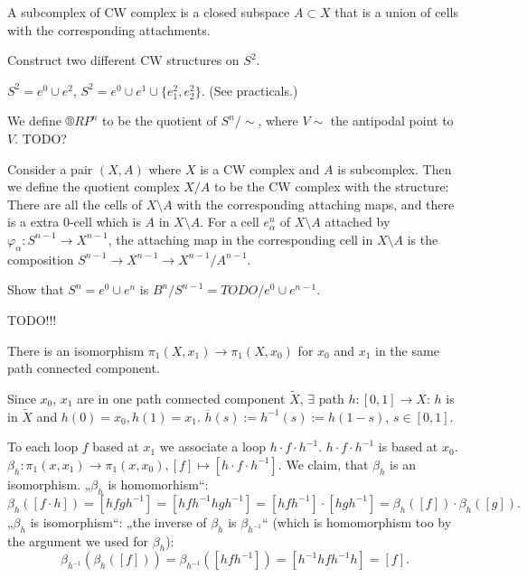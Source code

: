 \documentclass[12pt]{article}					%
\begin{document}
\begin{definice}
	A subcomplex of CW complex is a closed subspace $A \subset X$ that is a union of cells with the corresponding attachments.
\end{definice}

\begin{priklad}
	Construct two different CW structures on $S^2$.
	
	\begin{reseni}
		$S^2 = e^0 \cup e^2$, $S^2 = e^0 \cup e^1 \cup \{e^2_1, e^2_2\}$. (See practicals.)
	\end{reseni}
\end{priklad}

\begin{priklad}
	We define $®RP^n$ to be the quotient of $S^n / \sim$, where $V \sim $ the antipodal point to $V$. TODO?
\end{priklad}

\begin{definice}
	Consider a pair $(X, A)$ where $X$ is a CW complex and $A$ is subcomplex. Then we define the quotient complex $X / A$ to be the CW complex with the structure: There are all the cells of $X \setminus A$ with the corresponding attaching maps, and there is a extra $0$-cell which is $A$ in $X \setminus A$. For a cell $e_α^n$ of $X \setminus A$ attached by $φ_α: S^{n-1} \rightarrow X^{n - 1}$, the attaching map in the corresponding cell in $X \setminus A$ is the composition $S^{n-1} \rightarrow X^{n-1} \rightarrow X^{n-1} / A^{n-1}$.
\end{definice}

\begin{priklad}
	Show that $S^n = e^0 \cup e^n$ is $B^n / S^{n-1} = TODO / e^0 \cup e^{n-1}$.
\end{priklad}


TODO!!!


\begin{tvrzeni}
	There is an isomorphism $π_1(X, x_1) \rightarrow π_1(X, x_0)$ for $x_0$ and $x_1$ in the same path connected component.

	\begin{dukazin}
		Since $x_0$, $x_1$ are in one path connected component $\tilde X$, $\exists$ path $h: [0, 1] \rightarrow X$: $h$ is in $\tilde X$ and $h(0) = x_0, h(1) = x_1$. $\overline{h}(s) := h^{-1}(s) := h(1 - s)$, $s \in [0, 1]$.

		To each loop $f$ based at $x_1$ we associate a loop $h·f·h^{-1}$. $h·f·h^{-1}$ is based at $x_0$. $β_h : π_1(x, x_1) \rightarrow π_1(x, x_0), [f] \mapsto [h·f·h^{-1}]$. We claim, that $β_h$ is an isomorphism. „$β_h$ is homomorhism“:
		$$ β_h([f·h]) = [hfgh^{-1}] = [hfh^{-1} hgh^{-1}] = [hfh^{-1}]·[hgh^{-1}] = β_h([f])·β_h([g]). $$
		„$β_h$ is isomorphism“: „the inverse of $β_h$ is $β_{h^{-1}}$“ (which is homomorphism too by the argument we used for $β_h$):
		$$ β_{h^{-1}}(β_h([f])) = β_{h^{-1}}([hfh^{-1}]) = [h^{-1}hfh^{-1}h] = [f]. $$
	\end{dukazin}
\end{tvrzeni}
\end{document}
